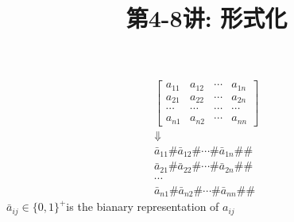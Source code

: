 \documentclass[a4paper, justified]{tufte-handout}
\title{第4-8讲: 形式化}
\date{\zhtoday} %
\begin{document}
\maketitle
\noplagiarism %
\begin{abstract}
\end{abstract}
\beginrequired

\begin{problem}[JH  2.3.1.8]
\end{problem}

\begin{solution}
  $$
    \begin{gathered}
      {\left[\begin{array}{cccc}
            a_{11}  & a_{12}  & \cdots & a_{1 n} \\
            a_{21}  & a_{22}  & \cdots & a_{2 n} \\
            \cdots  & \cdots  & \cdots & \cdots  \\
            a_{n 1} & a_{n 2} & \cdots & a_{n n}
          \end{array}\right]} \\
      \Downarrow \\
      \bar{a}_{11} \# \bar{a}_{12} \# \cdots \# \bar{a}_{1 n} \# \# \\
      \bar{a}_{21} \# \bar{a}_{22} \# \cdots \# \bar{a}_{2 n} \# \# \\
      \cdots \\
      \bar{a}_{n 1} \# \bar{a}_{n 2} \# \cdots \# \bar{a}_{n n} \# \#
    \end{gathered}
  $$
  $\bar{a}_{i j} \in\{0,1\}^{+}$is the bianary representation of $a_{i j}$
\end{solution}



\begin{problem}[JH  2.3.3.8]
\end{problem}
\end{document}
